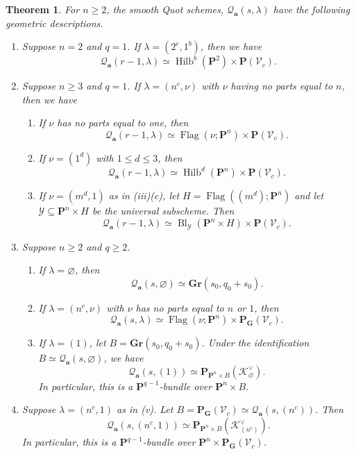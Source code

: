 \documentclass[leqno,11pt,a4paper]{amsart}
\newtheorem{thm}{Theorem}[section]
\theoremstyle{definition}
\numberwithin{equation}{section}
\newcommand{\Gr}{\mathbf{Gr}}
\newcommand{\bfa}{\mathbf{a}}
\newcommand{\PP}{\mathbf{P}}
\newcommand{\KK}{\mathscr{K}}
\newcommand{\QQ}{\mathcal{Q}}
\DeclareMathOperator{\Hilb}{Hilb}
\DeclareMathOperator{\Flag}{Flag}
\DeclareMathOperator{\Bl}{Bl}
\begin{document}
\begin{thm} \label{smooth_quot_geometry}
For $n\geq 2$, the smooth Quot schemes, $\QQ_{\bfa}(s,\lambda)$ have the following geometric descriptions.
\begin{enumerate}
\item
Suppose $n=2$ and $q=1$. If $\lambda=(2^c,1^b)$, then we have
$$
\QQ_{\bfa}(r-1,\lambda) \simeq \Hilb^b(\PP^2)\times\PP(\mathscr V_c).
$$
\item
Suppose $n\geq3$ and $q=1$.
If $\lambda=(n^c,\nu)$ with $\nu$ having no parts equal to $n$, then we have 
\begin{enumerate}
\item[(a)]
If $\nu$ has no parts equal to one, then
$$
\QQ_{\bfa}(r-1,\lambda) \simeq \Flag(\nu;\PP^n)\times\PP(\mathscr V_c).
$$
\item[(b)]
If $\nu=(1^d)$ with $1\leq d\leq3$, then
$$
\QQ_{\bfa}(r-1,\lambda) \simeq \Hilb^d(\PP^n)\times\PP(\mathscr V_c).
$$
\item[(c)]
If $\nu=(m^d,1)$ as in  (iii)(c), let $H=\Flag((m^d);\PP^n)$ and let $\mathcal Y\subseteq\PP^n\times H$ be the universal subscheme. 
Then
$$ \QQ_{\bfa}(r-1,\lambda) \simeq \Bl_{\mathcal Y}(\PP^n\times H) \times\PP(\mathscr V_c).$$
\end{enumerate}
\item
Suppose $n\geq2$ and $q\geq2$.
\begin{enumerate}
\item[(a)]If $\lambda=\varnothing$, then
$$
\QQ_{\bfa}(s,\varnothing) \simeq \Gr(s_0,q_0+s_0).
$$
\item[(b)] If $\lambda=(n^c,\nu)$ with $\nu$ has no parts equal to $n$ or $1$, then
$$
\QQ_{\bfa}(s,\lambda) \simeq \Flag(\nu;\PP^n) \times \PP_{\mathbf{G}}(\mathscr{V}_c).
$$
\item[(c)] If $\lambda=(1)$, let $B=\Gr(s_0,q_0+s_0)$.
Under the identification $B\simeq\QQ_{\bfa}(s,\varnothing)$, we have
$$
\QQ_{\bfa}(s,(1)) \simeq \PP_{\PP^n\times B}(\KK_\varnothing^\vee).
$$
In particular, this is a $\PP^{q-1}$-bundle over $\PP^n\times B$.
\end{enumerate}
\item
Suppose $\lambda=(n^c,1)$ as in  (v).
Let $B=\PP_{\mathbf G}(\mathscr V_c) \simeq\QQ_{\bfa}(s,(n^c))$. Then
$$
\QQ_{\bfa}(s,(n^c,1)) \simeq \PP_{\PP^n\times B}(\KK_{(n^c)}^\vee).
$$
In particular, this is a $\PP^{q-1}$-bundle over $\PP^n\times\PP_{\mathbf G}(\mathscr V_c)$.
\end{enumerate}
\end{thm}
\end{document}
